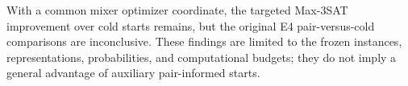 With a common mixer optimizer coordinate, the targeted Max-3SAT
improvement over cold starts remains, but the original E4 pair-versus-cold
comparisons are inconclusive. These findings are limited to the frozen
instances, representations, probabilities, and computational budgets;
they do not imply a general advantage of auxiliary pair-informed starts.
